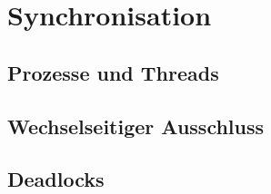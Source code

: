 \section{Synchronisation}

\subsection{Prozesse und Threads}

\subsection{Wechselseitiger Ausschluss}

\subsection{Deadlocks}
